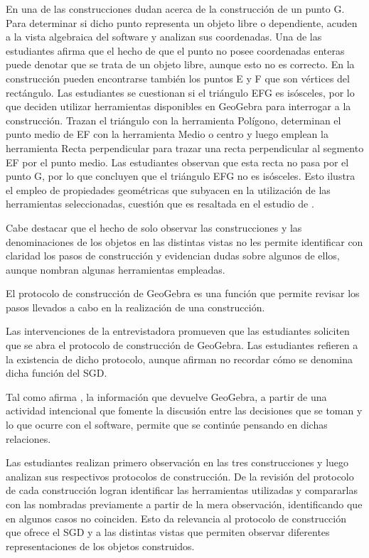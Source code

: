 \documentclass[oneside,spanish]{amsart}
\numberwithin{equation}{section}
\numberwithin{figure}{section}
\theoremstyle{definition}
\begin{document}
En una de las construcciones dudan acerca de la construcción de un punto G. Para determinar si dicho punto representa un objeto libre o dependiente, acuden a la vista algebraica del software y analizan sus coordenadas. Una de las estudiantes afirma que el hecho de que el punto no posee coordenadas enteras puede denotar que se trata de un objeto libre, aunque esto no es correcto. En la construcción pueden encontrarse también los puntos E y F que son vértices del rectángulo. Las estudiantes se cuestionan si el triángulo EFG es isósceles, por lo que deciden utilizar herramientas disponibles en GeoGebra para interrogar a la construcción. Trazan el triángulo con la herramienta Polígono, determinan el punto medio de EF con la herramienta Medio o centro y luego emplean la herramienta Recta perpendicular para trazar una recta perpendicular al segmento EF por el punto medio. Las estudiantes observan que esta recta no pasa por el punto G, por lo que concluyen que el triángulo EFG no es isósceles. Esto ilustra el empleo de propiedades geométricas que subyacen en la utilización de las herramientas seleccionadas, cuestión que es resaltada en el estudio de \citet{sanchez19}.

Cabe destacar que el hecho de solo observar las construcciones y las denominaciones de los objetos en las distintas vistas no les permite identificar con claridad los pasos de construcción y evidencian dudas sobre algunos de ellos, aunque nombran algunas herramientas empleadas.

El protocolo de construcción de GeoGebra es una función que permite revisar los pasos llevados a cabo en la realización de una construcción.

Las intervenciones de la entrevistadora promueven que las estudiantes soliciten que se abra el protocolo de construcción de GeoGebra. Las estudiantes refieren a la existencia de dicho protocolo, aunque afirman no recordar cómo se denomina dicha función del SGD.

Tal como afirma \citet{itzcovich20}, la información que devuelve GeoGebra, a partir de una actividad intencional que fomente la discusión entre las decisiones que se toman y lo que ocurre con el software, permite que se continúe pensando en dichas relaciones.

Las estudiantes realizan primero observación en las tres construcciones y luego analizan sus respectivos protocolos de construcción. De la revisión del protocolo de cada construcción logran identificar las herramientas utilizadas y compararlas con las nombradas previamente a partir de la mera observación, identificando que en algunos casos no coinciden. Esto da relevancia al protocolo de construcción que ofrece el SGD y a las distintas vistas que permiten observar diferentes representaciones de los objetos construidos.
\end{document}
